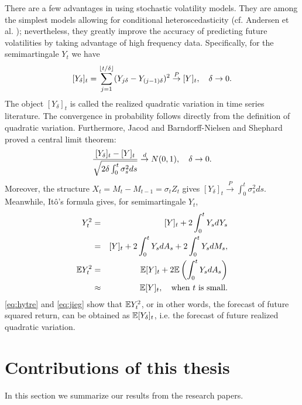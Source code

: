 There are a few advantages in using stochastic volatility models.
They are among the simplest models allowing for conditional
heteroscedasticity (cf. Andersen et al.
\cite{andersen:davis:kreiss:mikosch:2009}); nevertheless,
they greatly improve the accuracy of predicting future volatilities
by taking advantage of high frequency data. Specifically, for the
semimartingale $Y_t$ we have
\begin{equation}
  \label{eq:jieg}
  [Y_{\delta}]_t
  =
  \sum_{j=1}^{\lfloor t/\delta\rfloor}
  (Y_{j \delta} - Y_{(j-1)\delta})^2
  \overset{P}{\to} [Y]_t,
  \quad
  \delta \to 0.
\end{equation}
The object $[Y_\delta]_t$ is called the realized quadratic variation
in time series literature.
The convergence in probability follows directly from the definition of
quadratic variation.
Furthermore, Jacod \cite{jacod:1994} and
Barndorff-Nielsen and Shephard \cite{barndorff:shephard:2002} proved a
central limit theorem:
\[
  {[Y_\delta]_t - [Y]_t \over \sqrt{2 \delta \int_0^t \sigma_s^2 ds}}
  \overset{d}{\to} N(0, 1),
  \quad \delta \to 0.
\]
Moreover, the structure $X_t = M_{t} - M_{t-1} = \sigma_t Z_t$ gives
$[Y_\delta]_t \overset{P}{\to} \int_0^t \sigma_s^2 ds$. Meanwhile,
It\^o's formula gives, for semimartingale $Y_t$,
\begin{eqnarray}
  Y_t^2 &=& [Y]_t + 2 \int_0^t Y_s d Y_s \nonumber \\
  &=& [Y]_t + 2 \int_0^t Y_s dA_s + 2 \int_0^t Y_s dM_s, \nonumber \\
  \mathbb{E} Y_t^2 &=& \mathbb{E} [Y]_t + 2 \mathbb{E} \left( \int_0^t Y_s dA_s \right) \nonumber\\
  &\approx& \mathbb{E} [Y]_t, \quad \text{when $t$ is small}. \label{eq:hytre}
\end{eqnarray}
\eqref{eq:hytre} and \eqref{eq:jieg} show that $\mathbb{E} Y_t^2$, or in other
words, the forecast of future squared return, can be obtained as
$\mathbb{E} [Y_\delta]_t$, i.e. the forecast of future realized quadratic
variation.


\section{Contributions of this thesis}\label{sec:contr}

In this section we summarize our results from the research papers.

